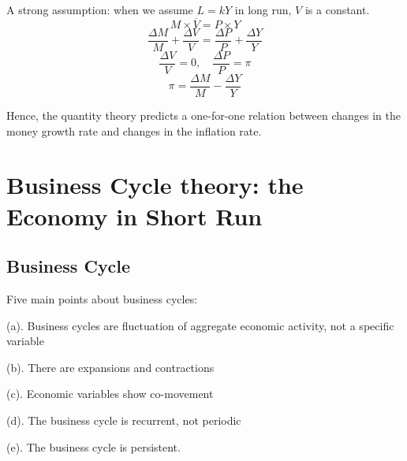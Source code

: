 \documentclass[10pt, a4paper]{article}
\begin{document}
        A strong assumption: when we assume $L = kY$ in long run, $V$ is a constant. 
        $$M \times \overline{V} = P \times Y$$
        $$\frac{\Delta M}{M} + \frac{\Delta V}{V} = \frac{\Delta P}{P} + \frac{\Delta Y}{Y}$$
        $$\frac{\Delta V}{V} = 0, \quad \frac{\Delta P}{P} = \pi$$
        $$\pi = \frac{\Delta M}{M} - \frac{\Delta Y}{Y}$$

        Hence, the quantity theory predicts a one-for-one relation between changes in the money growth rate and changes in the inflation rate. 
\newpage
\section{Business Cycle theory: the Economy in Short Run}
    \subsection{Business Cycle}
        Five main points about business cycles: 

        \quad (a). Business cycles are fluctuation of aggregate economic activity, not a specific variable 

        \quad (b). There are expansions and contractions 

        \quad (c). Economic variables show co-movement

        \quad (d). The business cycle is recurrent, not periodic

        \quad (e). The business cycle is persistent. 
\end{document}
